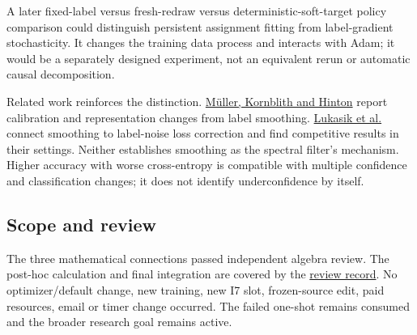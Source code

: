 \documentclass[
  british,
  10pt,
  a4paper,
]{article}
\begin{document}
A later fixed-\allowbreak{}label versus fresh-\allowbreak{}redraw versus
deterministi\allowbreak{}c-\allowbreak{}soft-\allowbreak{}target policy
comparison could distinguish persistent assignment fitting from
label-\allowbreak{}gradient stochasticit\allowbreak{}y.\allowbreak{} It
changes the training data process and interacts with Adam; it would be a
separately designed experiment,\allowbreak{} not an equivalent rerun or
automatic causal decompositio\allowbreak{}n.\allowbreak{}

Related work reinforces the distinction.\allowbreak{}
\href{https://papers.neurips.cc/paper_files/paper/2019/hash/f1748d6b0fd9d439f71450117eba2725-Abstract.html}{Müller,
Kornblith and Hinton} report calibration and representation changes from
label smoothing. \href{https://arxiv.org/abs/2003.02819}{Lukasik et al.}
connect smoothing to label-\allowbreak{}noise loss correction and find
competitive results in their settings. Neither establishes smoothing as
the spectral filter's mechanism. Higher accuracy with worse
cross-\allowbreak{}entropy is compatible with multiple confidence and
classification changes; it does not identify underconfidence by itself.

\subsection{Scope and review}\label{label-noise--scope-and-review}

The three mathematical connections passed independent algebra review.
The post-hoc calculation and final integration are covered by the
\href{../analysis/retention-identifiability-review.md}{review record}.
No optimizer/\allowbreak{}default change, new training, new I7 slot,
frozen-\allowbreak{}source edit, paid resources, email or timer change
occurred. The failed one-shot remains consumed and the broader research
goal remains active.
\end{document}
